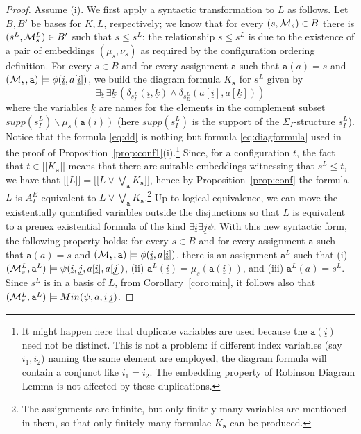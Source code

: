 \documentclass{LMCS}
\newcommand{\ui}{\ensuremath{\underline i}}
\newcommand{\uj}{\ensuremath{\underline j}}
\newcommand{\uk}{\ensuremath{\underline k}}
\newcommand{\cM}{\ensuremath \mathcal M}
\newcommand{\mywidehat}[1]{\ensuremath{\lbrack\!\lbrack #1 \rbrack\!\rbrack}}
\theoremstyle{plain}\newtheorem{assumption}[thm]{Assumption}
\theoremstyle{plain}\newtheorem{proposition}[thm]{Proposition}
\theoremstyle{plain}\newtheorem{property}[thm]{Property}
\theoremstyle{plain}\newtheorem{example}[thm]{Example}
\theoremstyle{plain}\newtheorem{claim}[thm]{Claim}
\theoremstyle{plain}\newtheorem{lemma}[thm]{Lemma}
\begin{document}
\begin{proof}
  Assume (i). We first apply a syntactic transformation to $L$ as
  follows.  Let $B, B'$ be bases for $K, L$, respectively; we know
  that for every $(s, \cM_s)\in B$ there is $(s^L, \cM_s^L)\in B'$
  such that $s\leq s^L$: the relationship $s\leq s^L$ is due to the
  existence of a pair of embeddings $(\mu_s, \nu_s)$ as required by
  the configuration ordering definition. For every $s\in B$ and for
  every assignment $\mathtt{a}$ such that $\mathtt{a}(a)=s$ and
  $(\cM_s, \mathtt{a})\models \phi(\ui, a[\ui])$, we build the diagram
  formula $K_{\mathtt{a}}$ for $s^L$ given by
  \begin{equation}
    \label{eq:dd}
    \exists\ui\,\exists\uk\, (\delta_{s^L_I}(\ui, \uk)
      \wedge \delta_{s^L_E}(a[\ui], a[\uk]))
    \end{equation}
    where the variables $\uk$ are names for the elements in the
    complement subset $supp(s^L_I)\backslash\mu_s(\mathtt{a}(\ui))$
    (here $supp(s^L_I)$ is the support of the $\Sigma_I$-structure
    $s^L_I$).  Notice that the formula \eqref{eq:dd} is nothing but
    formula \eqref{eq:diagformula} used in the proof of
    Proposition~\ref{prop:conf1}(i).\footnote{It might happen here
      that duplicate variables are used because the $\mathtt{a}(\ui)$
      need not be distinct. This is not a problem: if different index
      variables (say $i_1, i_2$) naming the same element are employed,
      the diagram formula will contain a conjunct like $i_1=i_2$.  The
      embedding property of Robinson Diagram Lemma is not affected by
      these duplications.  } Since, for a configuration $t$, the fact
    that $t\in\mywidehat{K_{\mathtt{a}}}$ means that there are
    suitable embeddings witnessing that $s^L\leq t$, we have that
    $\mywidehat{L}=\mywidehat{L\vee\bigvee_{\mathtt{a}}
      K_{\mathtt{a}}}$, hence by Proposition~\ref{prop:conf} the
    formula $L$ is $A^E_I$-equivalent to $L\vee\bigvee_{\mathtt{a}}
    K_{\mathtt{a}}$.\footnote{The assignments are infinite, but only
      finitely many variables are mentioned in them, so that only
      finitely many formulae $K_{\mathtt{a}}$ can be produced.}  Up to
    logical equivalence, we can move the existentially quantified
    variables outside the disjunctions so that $L$ is equivalent to a
    prenex existential formula of the kind $\exists\ui\exists\uj
    \psi$. With this new syntactic form, the following property holds:
    for every $s\in B$ and for every assignment $\mathtt{a}$ such that
    $\mathtt{a}(a)=s$ and $(\cM_s, \mathtt{a})\models \phi(\ui,
    a[\ui])$, there is an assignment $\mathtt{a}^L$ such that (i)
    $(\cM_s^L, \mathtt{a}^L)\models \psi(\ui, \uj, a[\ui], a[\uj])$,
    (ii) $\mathtt{a}^L(\ui)=\mu_s(\mathtt{a}(\ui))$, and (iii)
    $\mathtt{a}^L(a)= s^L$. Since $s^L$ is in a basis of $L$, from
    Corollary~\ref{coro:min}, it follows also that $(\cM_s^L,
    \mathtt{a}^L)\models Min(\psi, a, \ui\,\uj)$.


\end{proof}
\end{document}
